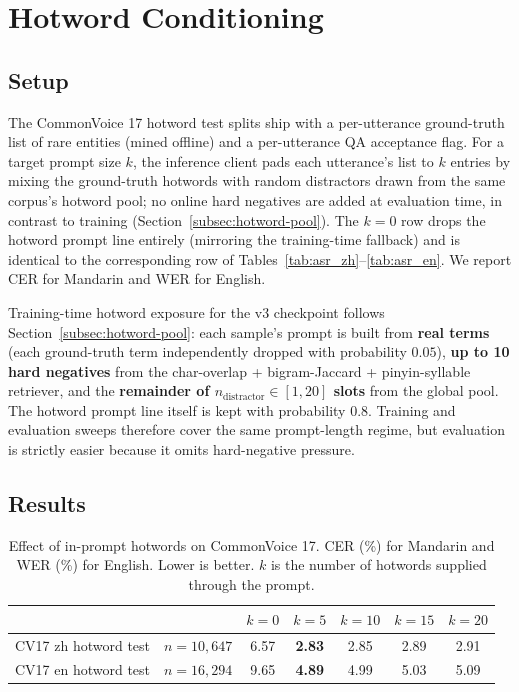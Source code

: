 \section{Hotword Conditioning}
\label{sec:hotwords}

\subsection{Setup}

The CommonVoice 17 hotword test splits ship with a per-utterance
ground-truth list of rare entities (mined offline) and a per-utterance
QA acceptance flag. For a target prompt size $k$, the inference client
pads each utterance's list to $k$ entries by mixing the ground-truth
hotwords with random distractors drawn from the same corpus's hotword
pool; no online hard negatives are added at evaluation time, in
contrast to training (Section~\ref{subsec:hotword-pool}). The $k=0$
row drops the hotword prompt line entirely (mirroring the training-time
fallback) and is identical to the corresponding row of
Tables~\ref{tab:asr_zh}--\ref{tab:asr_en}. We report CER for Mandarin
and WER for English.

Training-time hotword exposure for the v3 checkpoint follows
Section~\ref{subsec:hotword-pool}: each sample's prompt is built from
\textbf{real terms} (each ground-truth term independently dropped with
probability $0.05$), \textbf{up to 10 hard negatives} from the
char-overlap + bigram-Jaccard + pinyin-syllable retriever, and the
\textbf{remainder of $n_\text{distractor}\!\in\![1, 20]$ slots} from
the global pool. The hotword prompt line itself is kept with
probability $0.8$. Training and evaluation sweeps therefore cover the
same prompt-length regime, but evaluation is strictly easier because
it omits hard-negative pressure.

\subsection{Results}

\begin{table}[t]
  \caption{Effect of in-prompt hotwords on CommonVoice 17. CER (\%) for
    Mandarin and WER (\%) for English. Lower is better. $k$ is the
    number of hotwords supplied through the prompt.}
  \label{tab:hotwords}
  \centering
  \small
  \begin{tabular}{lrccccc}
    \toprule
    & & $k=0$ & $k=5$ & $k=10$ & $k=15$ & $k=20$ \\
    \midrule
    CV17 zh hotword test  & $n=10{,}647$ & 6.57 & \textbf{2.83} & 2.85 & 2.89 & 2.91 \\
    CV17 en hotword test  & $n=16{,}294$ & 9.65 & \textbf{4.89} & 4.99 & 5.03 & 5.09 \\
    \bottomrule
  \end{tabular}
\end{table}

